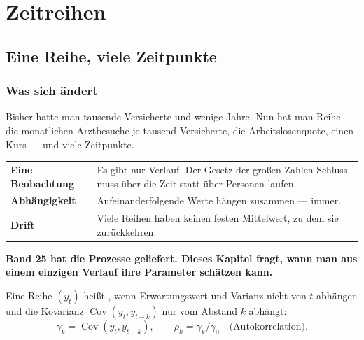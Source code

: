 \part{Zeitreihen}

\chapter{Eine Reihe, viele Zeitpunkte}

\section{Was sich ändert}

\begin{merksatz}
Bisher hatte man tausende Versicherte und wenige Jahre. Nun hat man  Reihe --- die monatlichen Arztbesuche je tausend Versicherte, die Arbeitslosenquote, einen Kurs --- und viele Zeitpunkte.

\begin{center}
{\small
\renewcommand{\arraystretch}{1.52}
\begin{tabular}{@{}P{2.6cm}P{6.0cm}@{}}
\toprule
\textbf{Eine Beobachtung} & Es gibt nur  Verlauf. Der Gesetz-der-großen-Zahlen-Schluss muss über die Zeit statt über Personen laufen.\\
\textbf{Abhängigkeit} & Aufeinanderfolgende Werte hängen zusammen --- immer.\\
\textbf{Drift} & Viele Reihen haben keinen festen Mittelwert, zu dem sie zurückkehren.\\
\bottomrule
\end{tabular}}
\end{center}

\begin{center}
\begin{minipage}{0.9\textwidth}
\textbf{Band 25 hat die Prozesse geliefert. Dieses Kapitel fragt, wann man aus einem einzigen Verlauf ihre Parameter schätzen kann.}
\end{minipage}
\end{center}
\end{merksatz}

\begin{definition}
Eine Reihe $(y_t)$ heißt , wenn Erwartungswert und Varianz nicht von $t$ abhängen und die Kovarianz $\operatorname{Cov}(y_t,y_{t-k})$ nur vom Abstand $k$ abhängt:
\[ \gamma_k = \operatorname{Cov}(y_t,y_{t-k}), \qquad \rho_k = \gamma_k/\gamma_0 \quad\text{(Autokorrelation)}. \]
\end{definition}

